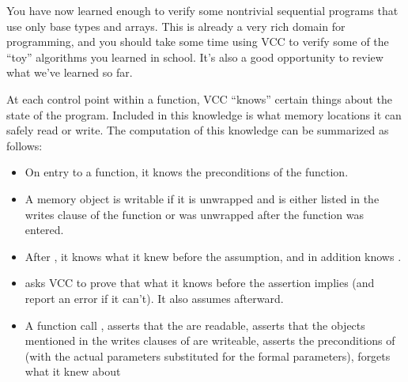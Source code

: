 {{You have now learned enough to verify some nontrivial sequential
programs that use only base types and arrays.  This is already a very
rich domain for programming, and you should take some time using VCC
to verify some of the ``toy'' algorithms you learned in school. It's
also a good opportunity to review what we've learned so far.

At each control point within a function, VCC ``knows'' certain things
about the state of the program. Included in this knowledge is what
memory locations it can safely read or write. The computation of this
knowledge can be summarized as follows:
\begin{itemize}
\item
On entry to a function, it knows the preconditions of the function.
\item
A memory object is writable if it is unwrapped and is either listed in the 
writes clause of the function or was unwrapped after the function was entered.
\item
After , it knows what it knew before the assumption,
and in addition knows .
\item
{} asks VCC to prove that what it knows before the
assertion implies  (and report an error if it can't). 
It also assumes  afterward.
\item 
A function call , 
asserts that the  are readable, asserts that the objects
mentioned in the writes clauses of  are writeable,
asserts the preconditions of  (with the actual parameters
substituted for the formal parameters), forgets what it knew about

\end{itemize}}}

